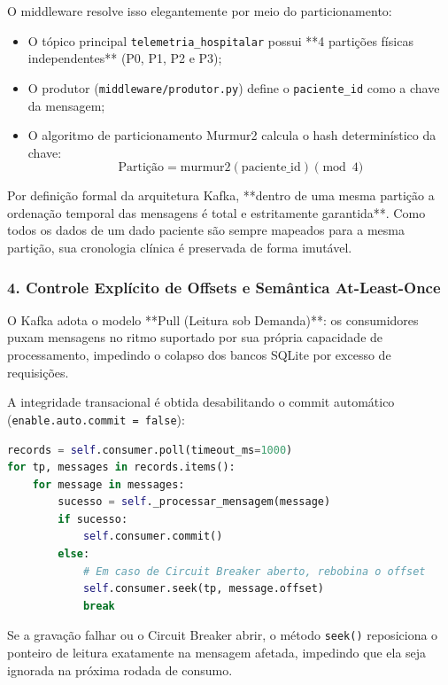 \documentclass[12pt,a4paper]{article}
\begin{document}
O middleware resolve isso elegantemente por meio do particionamento:
\begin{itemize}
	\item O tópico principal \texttt{telemetria\_hospitalar} possui **4 partições físicas independentes** (P0, P1, P2 e P3);
	\item O produtor (\texttt{middleware/produtor.py}) define o \texttt{paciente\_id} como a chave da mensagem;
	\item O algoritmo de particionamento Murmur2 calcula o hash determinístico da chave:
	\begin{equation}
		\text{Partição} = \text{murmur2}(\text{paciente\_id}) \pmod 4
	\end{equation}
\end{itemize}
Por definição formal da arquitetura Kafka, **dentro de uma mesma partição a ordenação temporal das mensagens é total e estritamente garantida**. Como todos os dados de um dado paciente são sempre mapeados para a mesma partição, sua cronologia clínica é preservada de forma imutável.

\subsubsection{4. Controle Explícito de Offsets e Semântica At-Least-Once}
O Kafka adota o modelo **Pull (Leitura sob Demanda)**: os consumidores puxam mensagens no ritmo suportado por sua própria capacidade de processamento, impedindo o colapso dos bancos SQLite por excesso de requisições.

A integridade transacional é obtida desabilitando o commit automático (\texttt{enable.auto.commit = false}):
\begin{lstlisting}[language=Python]
records = self.consumer.poll(timeout_ms=1000)
for tp, messages in records.items():
    for message in messages:
        sucesso = self._processar_mensagem(message)
        if sucesso:
            self.consumer.commit()
        else:
            # Em caso de Circuit Breaker aberto, rebobina o offset
            self.consumer.seek(tp, message.offset)
            break
\end{lstlisting}
Se a gravação falhar ou o Circuit Breaker abrir, o método \texttt{seek()} reposiciona o ponteiro de leitura exatamente na mensagem afetada, impedindo que ela seja ignorada na próxima rodada de consumo.
\end{document}
